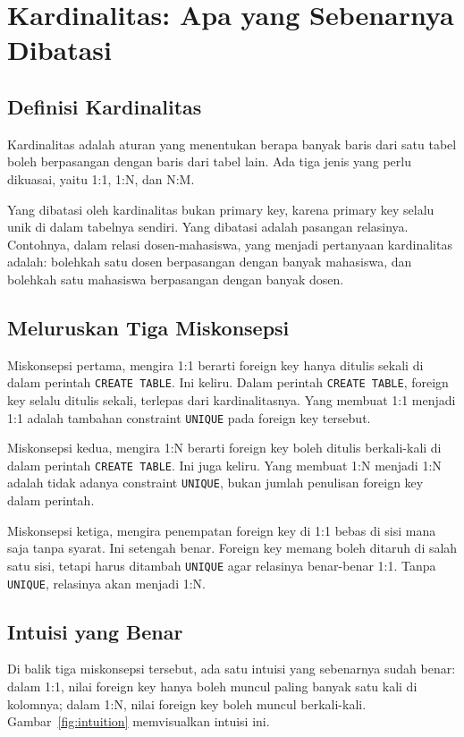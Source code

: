 \documentclass[11pt,a4paper]{article}
\begin{document}
\section{Kardinalitas: Apa yang Sebenarnya Dibatasi}

\subsection{Definisi Kardinalitas}

Kardinalitas adalah aturan yang menentukan berapa banyak baris dari satu tabel boleh berpasangan dengan baris dari tabel lain. Ada tiga jenis yang perlu dikuasai, yaitu 1:1, 1:N, dan N:M.

Yang dibatasi oleh kardinalitas bukan primary key, karena primary key selalu unik di dalam tabelnya sendiri. Yang dibatasi adalah pasangan relasinya. Contohnya, dalam relasi dosen-mahasiswa, yang menjadi pertanyaan kardinalitas adalah: bolehkah satu dosen berpasangan dengan banyak mahasiswa, dan bolehkah satu mahasiswa berpasangan dengan banyak dosen.

\subsection{Meluruskan Tiga Miskonsepsi}

Miskonsepsi pertama, mengira 1:1 berarti foreign key hanya ditulis sekali di dalam perintah \texttt{CREATE TABLE}. Ini keliru. Dalam perintah \texttt{CREATE TABLE}, foreign key selalu ditulis sekali, terlepas dari kardinalitasnya. Yang membuat 1:1 menjadi 1:1 adalah tambahan constraint \texttt{UNIQUE} pada foreign key tersebut.

Miskonsepsi kedua, mengira 1:N berarti foreign key boleh ditulis berkali-kali di dalam perintah \texttt{CREATE TABLE}. Ini juga keliru. Yang membuat 1:N menjadi 1:N adalah tidak adanya constraint \texttt{UNIQUE}, bukan jumlah penulisan foreign key dalam perintah.

Miskonsepsi ketiga, mengira penempatan foreign key di 1:1 bebas di sisi mana saja tanpa syarat. Ini setengah benar. Foreign key memang boleh ditaruh di salah satu sisi, tetapi harus ditambah \texttt{UNIQUE} agar relasinya benar-benar 1:1. Tanpa \texttt{UNIQUE}, relasinya akan menjadi 1:N.

\subsection{Intuisi yang Benar}

Di balik tiga miskonsepsi tersebut, ada satu intuisi yang sebenarnya sudah benar: dalam 1:1, nilai foreign key hanya boleh muncul paling banyak satu kali di kolomnya; dalam 1:N, nilai foreign key boleh muncul berkali-kali. Gambar~\ref{fig:intuition} memvisualkan intuisi ini.
\end{document}
